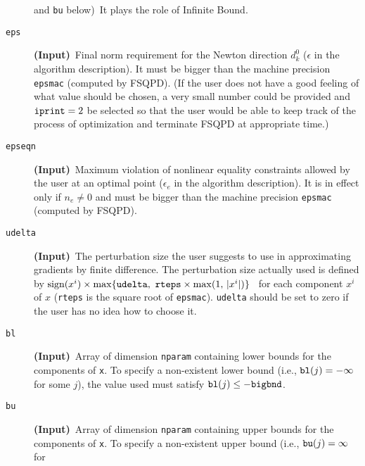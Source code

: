 \begin{description}
                  and {\tt bu} below)~It plays the role of 
                  Infinite Bound.
\item[\tt eps]    {\bf (Input)}~Final norm requirement for 
                  the Newton direction $d_k^0$ ($\epsilon$ in the 
                  algorithm description). It must be bigger 
                  than the machine
                  precision {\tt epsmac} (computed by FSQPD).
                  (If the user does not have a good feeling of
                  what value should be chosen, a very small
                  number could be provided and $\mbox{\tt iprint}=2$
                  be selected so that the user would be able to keep track of 
                  the process of optimization and terminate FSQPD
                  at appropriate time.)
\item[\tt epseqn] {\bf (Input)}~Maximum violation of nonlinear equality
                  constraints allowed by the user at an optimal point
                  ($\epsilon_e$ in the algorithm description). 
                  It is in effect only if $n_e\ne 0$ and
                  must be bigger than the machine
                  precision {\tt epsmac} (computed by FSQPD). 
\item[\tt udelta]  {\bf (Input)}~The perturbation  
                  size the user suggests to use in 
                  approximating gradients by finite difference.
                  The perturbation size actually used is defined by 
$\mbox{sign}(x^i)\times\max \{{\tt udelta},~
                  {\tt rteps}\times \max (1,\,|x^i|)\}$~
                  for each component $x^i$ of $x$ ({\tt rteps} 
                  is the square root of {\tt epsmac}). {\tt udelta}
                  should be set to zero if the user has no idea
                  how to choose it.
\item[\tt bl]     {\bf (Input)}~Array of 
                  dimension {\tt nparam} containing
                  lower bounds for the components of {\tt x}. 
                  To specify a non-existent lower 
                  bound (i.e., ${\tt bl}(j)=-\infty$ for 
                  some $j$), the value used must 
                  satisfy ${\tt bl}(j)\leq -{\tt bigbnd}$.
\item[\tt bu]     {\bf (Input)}~Array of 
                  dimension {\tt nparam} containing
                  upper bounds for the components of {\tt x}. 
                  To specify a non-existent upper 
                  bound (i.e., ${\tt bu}(j)=\infty$ for 

\end{description}
